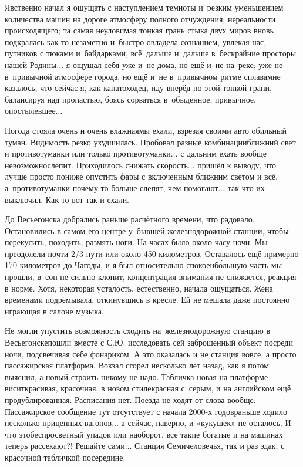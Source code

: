 Явственно начал я ощущать с наступлением темноты и~резким уменьшением количества машин на дороге атмосферу полного отчуждения, нереальности происходящего; та самая неуловимая тонкая грань стыка двух миров вновь подкралась как-то незаметно и~быстро овладела сознанием, увлекая нас, путников с тюками и~байдарками, всё~дальше и~дальше в~бескрайние просторы нашей Родины$\ldots$ я ощущал себя уже и~не дома, но ещё и~не на~реке; уже не в~привычной атмосфере города, но ещё и~не в~привычном ритме сплава\mdash мне казалось, что сейчас я, как канатоходец, иду вперёд по этой тонкой грани, балансируя над пропастью, боясь сорваться в~обыденное, привычное, опостылевшее$\ldots$

Погода стояла очень и очень влажная\mdash мы ехали, взрезая своими авто обильный туман. Видимость резко ухудшилась. Пробовал разные комбинации\mdash ближний свет и противотуманки или только противотуманки$\ldots$ с дальним ехать вообще невозможно\mdash слепит. Приходилось снижать скорость$\ldots$ пришёл к выводу, что лучше просто пониже опустить фары с включенным ближним светом и всё, а~противотуманки почему-то больше слепят, чем помогают$\ldots$ так что их выключил. Как-то вот так и ехали. 

До Весьегонска добрались раньше расчётного времени, что радовало. Остановились в самом его центре у~бывшей железнодорожной станции, чтобы перекусить, походить, размять ноги. На часах было около часу ночи. Мы преодолели почти 2/3 пути или около 450 километров. Оставалось ещё примерно 170 километров до Чагоды, и я был относительно спокоен\mdash б\'{о}льшую часть мы прошли, в~сон не сильно клонит, концентрация внимания не снижается, реакция в норме. Хотя, некоторая усталость, естественно, начала ощущаться. Жена временами подрёмывала, откинувшись в кресле. Ей не мешала даже постоянно играющая в салоне музыка. 

Не могли упустить возможность сходить на~железнодорожную станцию в Весьегонске\mdash пошли вместе с С.Ю. исследовать сей заброшенный объект посреди ночи, подсвечивая себе фонариком. А это оказалась и не станция вовсе, а просто пассажирская платформа. Вокзал сгорел несколько лет назад, как я потом выяснил, а новый строить никому не надо. Табличка новая на платформе висит\mdash красивая, красочная, в новом стиле\mdash красная с~серым, и на английском ещё продублированная. Расписания нет. Поезда не ходят от слова вообще. Пассажирское сообщение тут отсутствует с начала 2000-х годов\mdash раньше ходило несколько прицепных вагонов$\ldots$ а сейчас, наверно, и «кукушек» не осталось. И что это\mdash беспросветный упадок или наоборот, все такие богатые и на машинах теперь рассекают?! Решайте сами$\ldots$ Станция Семичеловечья\cite{ГеографГлобусПропил}, так и раз эдак, с красочной табличкой посередине.

